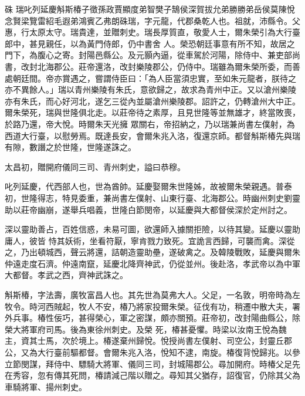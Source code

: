 
\begin{pinyinscope}

 硃
 瑞叱列延慶斛斯椿子徵孫政賈顯度弟智樊子鵠侯深賀拔允弟勝勝弟岳侯莫陳悅念賢梁覽雷紹毛遐弟鴻賓乙弗朗硃瑞，字元龍，代郡桑乾人也。祖就，沛縣令。父惠，行太原太守。瑞貴達，並贈刺史。瑞長厚質直，敬愛人士，爾朱榮引為大行臺郎中，甚見親任，以為黃門侍郎，仍中書舍
 人。榮恐朝廷事意有所不知，故居之門下，為腹心之寄。封陽邑縣公。及元顥內逼，從車駕於河陽，除侍中、兼吏部尚書，改封北海郡公。莊帝還洛，改封樂陵郡公，仍侍中。瑞雖為爾朱榮所委，而善處朝廷間。帝亦賞遇之，嘗謂侍臣曰：「為人臣當須忠實，至如朱元龍者，朕待之亦不異餘人。」瑞以青州樂陵有朱氏，意欲歸之，故求為青州中正。又以滄州樂陵亦有朱氏，而心好河北，遂乞三從內並屬滄州樂陵郡。詔許之，仍轉滄州大中正。爾朱榮死，瑞與世隆俱北走。以莊帝待之素厚，且見世隆等並無雄才，終當敗喪，於路乃還，帝大悅。時爾朱天光擁
 眾關右，帝招納之，乃以瑞兼尚書左僕射，為西道大行臺，以慰勞焉。既達長安，會爾朱兆入洛，復還京師。都督斛斯椿先與瑞有隙，數譖之於世隆，世隆遂誅之。



 太昌初，贈開府儀同三司、青州刺史，謚曰恭穆。



 叱列延慶，代西部人也，世為酋帥。延慶娶爾朱世隆姊，故被爾朱榮親遇。普泰初，世隆得志，特見委重，兼尚書左僕射、山東行臺、北海郡公。時幽州刺史劉靈助以莊帝幽崩，遂舉兵唱義，世隆白節閔帝，以延慶與大都督侯深於定州討之。



 深以靈助善占，百姓信惑，未易可圖，欲還師入據關拒險，以待其變。延慶以靈助庸人，彼皆
 恃其妖術，坐看符厭，寧肯戮力致死。宜詭言西歸，可襲而禽。深從之，乃出頓城西，聲云將還，詰朝造靈助壘，遂破禽之。及韓陵戰敗，延慶與爾朱仲遠走度石濟。仲遠南竄，延慶北降齊神武，仍從並州。後赴洛，孝武帝以為中軍大都督。孝武之西，齊神武誅之。



 斛斯椿，字法壽，廣牧富昌人也。其先世為莫弗大人。父足，一名敦，明帝時為左牧令。時河西賊起，牧人不安，椿乃將家投爾朱榮。征伐有功，稍遷中散大夫，署外兵事。椿性佞巧，甚得榮心，軍之密謀，頗亦關預。莊帝初，改封陽曲縣公，除榮大將軍府司馬。後為東徐州刺史。及榮
 死，椿甚憂懼。時梁以汝南王悅為魏主，資其士馬，次於境上。椿遂棄州歸悅。悅授尚書左僕射、司空公，封靈丘郡公，又為大行臺前驅都督。會爾朱兆入洛，悅知不逮，南旋。椿復背悅歸兆。以參立節閔謀，拜侍中、驃騎大將軍、儀同三司，封城陽郡公。尋加開府。時椿父足先在秀容，忽有傳其死問，椿請減己階以贈之。尋知其父猶存，詔復官，仍除其父為車騎將軍、揚州刺史。




\end{pinyinscope}
